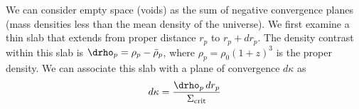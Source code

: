 We can consider empty space (voids) as the sum of negative convergence planes  (mass densities less than the mean density of the universe). We first examine a thin slab that extends from proper distance $r_p$ to $r_p+dr_p$.  The density contrast within this slab is $\drho_p = \rho_p - \bar\rho_p$, where $\rho_p = \rho_0 (1+z)^3$ is the proper density.  We can associate this slab with a plane of convergence $d\kappa$ as
  \begin{equation}
\label{eqn:dkappa}
  d\kappa = \frac{\drho_p\,dr_p}{\Sigma_{\rm crit}}
 \end{equation}

  
  
  
  